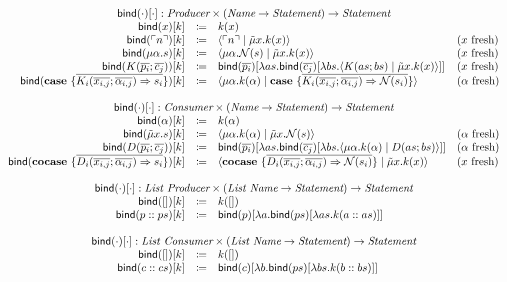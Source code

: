 \[
  \begin{array}{rcll}
    \multicolumn{4}{c}{\bind{\cdot}{\cdot} : \emph{Producer} \times (\emph{Name} \rightarrow \emph{Statement}) \rightarrow \emph{Statement}}\\
    \bind{x}{k} & \coloneq & k(x) & \\
    \bind{\lit{n}}{k} & \coloneq & \cut{\lit{n}}{\tilde{\mu}x.k(x)} & \fresh{x} \\
    \bind{\mu\alpha.s}{k} & \coloneq & \cut{\mu\alpha.\name{s}}{\tilde{\mu}x.k(x)} & \fresh{x} \\
    \bind{K(\overline{p_i}; \overline{c_{j}})}{k} & \coloneq & \bind{\overline{p_i}}{\lambda as.\bind{\overline{c_j}}{\lambda bs.\cut{K(as; bs)}{\tilde{\mu}x.k(x)}}} & \fresh{x} \\
    \bind{\case{\overline{K_i(\overline{x_{i,j}}; \overline{\alpha_{i,j}}) \Rightarrow s_i}}}{k} & \coloneq & \cut{\mu\alpha.k(\alpha)}{\case{\overline{K_i(\overline{x_{i,j}}; \overline{\alpha_{i,j}}) \Rightarrow \name{s_i}}}} & \fresh{\alpha} \\
    \\
    \multicolumn{4}{c}{\bind{\cdot}{\cdot} : \emph{Consumer} \times (\emph{Name} \rightarrow \emph{Statement}) \rightarrow \emph{Statement}}\\
    \bind{\alpha}{k} & \coloneq & k(\alpha) & \\
    \bind{\tilde{\mu}x.s}{k} & \coloneq & \cut{\mu\alpha.k(\alpha)}{\tilde{\mu}x.\name{s}} & \fresh{\alpha} \\
    \bind{D(\overline{p_i}; \overline{c_{j}})}{k} & \coloneq & \bind{\overline{p_i}}{\lambda as.\bind{\overline{c_j}}{\lambda bs.\cut{\mu\alpha.k(\alpha)}{D(as; bs)}}} & \fresh{\alpha} \\
    \bind{\cocase{\overline{D_i(\overline{x_{i,j}}; \overline{\alpha_{i,j}}) \Rightarrow s_i}}}{k} & \coloneq & \cut{\cocase{\overline{D_i(\overline{x_{i,j}}; \overline{\alpha_{i,j}}) \Rightarrow \name{s_i}}}}{\tilde{\mu}x.k(x)} & \fresh{x} \\
    \\
    \multicolumn{4}{c}{\bind{\cdot}{\cdot} : \emph{List Producer} \times (\emph{List Name} \rightarrow \emph{Statement}) \rightarrow \emph{Statement}}\\
    \bind{[]}{k} & \coloneq & k([]) & \\
    \bind{p :: ps}{k} & \coloneq & \bind{p}{\lambda a.\bind{ps}{\lambda as.k(a :: as)}} & \\
    \\
    \multicolumn{4}{c}{\bind{\cdot}{\cdot} : \emph{List Consumer} \times (\emph{List Name} \rightarrow \emph{Statement}) \rightarrow \emph{Statement}}\\
    \bind{[]}{k} & \coloneq & k([]) & \\
    \bind{c :: cs}{k} & \coloneq & \bind{c}{\lambda b.\bind{ps}{\lambda bs.k(b :: bs)}} & \\
  \end{array}
\]
